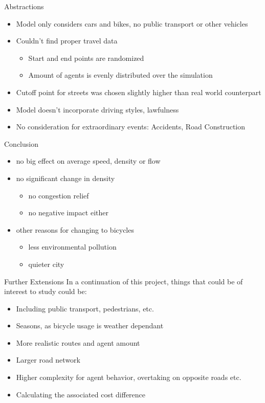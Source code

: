
\begin{frame}{Abstractions}
\begin{itemize}
    \item<2->[-] Model only considers cars and bikes, no public transport or other vehicles
    \item<3->[-] Couldn't find proper travel data
    \begin{itemize}
        \item<4->[-] Start and end points are randomized
        \item<5->[-] Amount of agents is evenly distributed over the simulation
    \end{itemize}
    \item<6->[-] Cutoff point for streets was chosen slightly higher than real world counterpart
    \item<7->[-] Model doesn't incorporate driving styles, lawfulness
    \item<8->[-] No consideration for extraordinary events: Accidents, Road Construction
\end{itemize}
\end{frame}

\begin{frame}{Conclusion}
\begin{itemize}
    \item<2->[-] no big effect on average speed, density or flow
    \item<3->[-] no significant change in density
    \begin{itemize}
        \item<4->[-] no congestion relief
        \item<5->[-] no negative impact either
    \end{itemize}
    \item<6->[-] other reasons for changing to bicycles
    \begin{itemize}
        \item<7->[-] less environmental pollution
        \item<8->[-] quieter city
    \end{itemize}
\end{itemize}
\end{frame}

\begin{frame}{Further Extensions}
In a continuation of this project, things that could be of interest to study could be:
\begin{itemize}
    \item<2->[-] Including public transport, pedestrians, etc.
    \item<3->[-] Seasons, as bicycle usage is weather dependant
    \item<4->[-] More realistic routes and agent amount
    \item<5->[-] Larger road network
    \item<6->[-] Higher complexity for agent behavior, overtaking on opposite roads etc.
    \item<7->[-] Calculating the associated cost difference
\end{itemize}
\end{frame}
